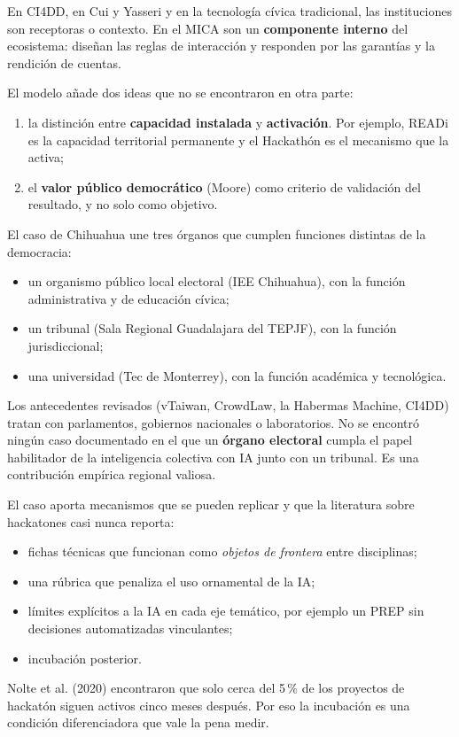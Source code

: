 \documentclass[11pt,a4paper]{article}
\begin{document}
\begin{original}
En CI4DD, en Cui y Yasseri y en la tecnología cívica tradicional, las instituciones son receptoras o contexto. En el MICA son un \textbf{componente interno} del ecosistema: diseñan las reglas de interacción y responden por las garantías y la rendición de cuentas.

El modelo añade dos ideas que no se encontraron en otra parte:
\begin{enumerate}
  \item la distinción entre \textbf{capacidad instalada} y \textbf{activación}. Por ejemplo, READi es la capacidad territorial permanente y el Hackathón es el mecanismo que la activa;
  \item el \textbf{valor público democrático} (Moore) como criterio de validación del resultado, y no solo como objetivo.
\end{enumerate}
\end{original}

\begin{original}
El caso de Chihuahua une tres órganos que cumplen funciones distintas de la democracia:
\begin{itemize}
  \item un organismo público local electoral (IEE Chihuahua), con la función administrativa y de educación cívica;
  \item un tribunal (Sala Regional Guadalajara del TEPJF), con la función jurisdiccional;
  \item una universidad (Tec de Monterrey), con la función académica y tecnológica.
\end{itemize}
Los antecedentes revisados (vTaiwan, CrowdLaw, la Habermas Machine, CI4DD) tratan con parlamentos, gobiernos nacionales o laboratorios. No se encontró ningún caso documentado en el que un \textbf{órgano electoral} cumpla el papel habilitador de la inteligencia colectiva con IA junto con un tribunal. Es una contribución empírica regional valiosa.
\end{original}

\begin{original}
El caso aporta mecanismos que se pueden replicar y que la literatura sobre hackatones casi nunca reporta:
\begin{itemize}
  \item fichas técnicas que funcionan como \emph{objetos de frontera} entre disciplinas;
  \item una rúbrica que penaliza el uso ornamental de la IA;
  \item límites explícitos a la IA en cada eje temático, por ejemplo un PREP sin decisiones automatizadas vinculantes;
  \item incubación posterior.
\end{itemize}
Nolte et al. (2020) encontraron que solo cerca del 5\,\% de los proyectos de hackatón siguen activos cinco meses después. Por eso la incubación es una condición diferenciadora que vale la pena medir.
\end{original}
\end{document}
